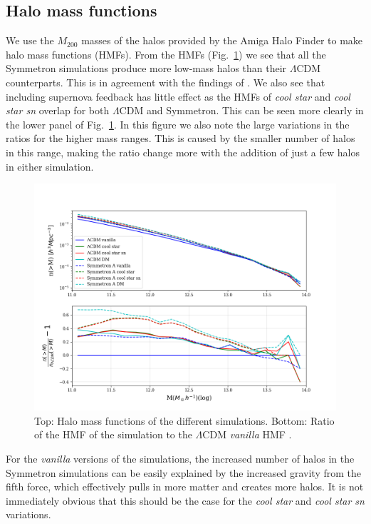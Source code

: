 \documentclass{aa}
\begin{document}
\subsection{Halo mass functions}\label{sec:symahmf}
We use the $M_{200}$ masses of the halos provided by the Amiga Halo Finder to make halo mass functions (HMFs). From the HMFs (Fig.~\ref{fig:HMF_symaonly_20}) we see that all the Symmetron simulations produce more low-mass  halos than their $\Lambda$CDM counterparts. This is in agreement with the findings of \citet{davis2012structure}. We also see that including supernova feedback has little effect as the HMFs of \textit{cool star} and \textit{cool star sn} overlap for both $\Lambda$CDM and Symmetron. This can be seen more clearly in the lower panel of Fig.~\ref{fig:HMF_symaonly_20}. In this figure we also note the large variations in the ratios for the higher mass ranges. This is caused by the smaller number of halos in this range, making the ratio change more with the addition of just a few halos in either simulation.
\begin{figure}
        \includegraphics[width=\columnwidth]{HMF_symaonly_20}
    \caption{Top: Halo mass functions of the different simulations. Bottom: Ratio of the HMF of the simulation to the $\Lambda$CDM \textit{vanilla} HMF .}
    \label{fig:HMF_symaonly_20}
\end{figure}

For the \textit{vanilla} versions of the simulations, the increased number of halos in the Symmetron simulations can be easily explained by the increased gravity from the fifth force, which effectively pulls in more matter and creates more halos. It is not immediately obvious that this should be the case for the \textit{cool star} and \textit{cool star sn} variations. 
\end{document}
